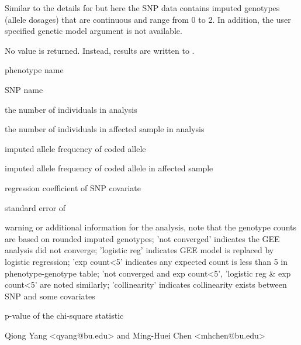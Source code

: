 \begin{Details}\relax
Similar to the details for  but here the SNP data contains imputed genotypes (allele dosages) 
that are continuous and range from 0 to 2. In addition, the user 
specified genetic model argument is not available.
\end{Details}
\begin{Value}
No value is returned. Instead, results are written to .

\begin{ldescription}
\item[\code{phen }] phenotype name
\item[\code{snp }] SNP name
\item[\code{N }] the number of individuals in analysis
\item[\code{Nd }] the number of individuals in affected sample in analysis
\item[\code{AF }] imputed allele frequency of coded allele
\item[\code{AFd }] imputed allele frequency of coded allele in affected sample
\item[\code{beta }] regression coefficient of SNP covariate
\item[\code{se }] standard error of 
\item[\code{remark }] warning or additional information for the analysis, note that the genotype counts are based
on rounded imputed genotypes; 'not converged' indicates the 
GEE analysis did not converge; 'logistic reg' indicates GEE model is replaced by logistic regression;
'exp count<5' indicates any expected count is less than 5 in phenotype-genotype table; 'not converged 
and exp count<5', 'logistic reg \& exp count<5' are noted similarly; 'collinearity' indicates collinearity
exists between SNP and some covariates
\item[\code{pval }] p-value of the chi-square statistic
\end{ldescription}
\end{Value}
\begin{Author}\relax
Qiong Yang <qyang@bu.edu> and Ming-Huei Chen <mhchen@bu.edu>
\end{Author}

